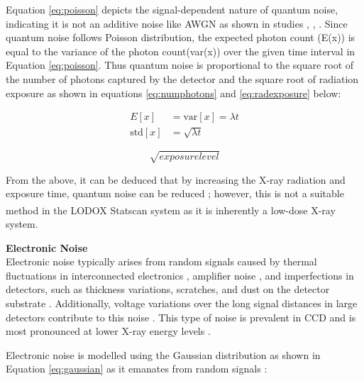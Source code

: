 Equation \ref{eq:poisson}  depicts the signal-dependent nature of quantum noise, indicating it is not an additive noise like \gls{AWGN} as shown in studies  \cite{khan_new_2016}, \cite{thanh_review_2019}, \cite{chandra_analysis_2020}. Since quantum noise follows Poisson distribution, the expected photon count (E(x)) is equal to the variance of the photon count(var(x)) over the given time interval in Equation \ref{eq:poisson}. Thus quantum noise is proportional to the square root of the number of photons captured by the detector \cite{chandra_analysis_2020} and the square root of radiation exposure \cite{huda_radiographic_2015} as shown in equations \ref{eq:numphotons} and \ref{eq:radexposure} below:

\begin{equation}
\begin{aligned}
    E[x] &= \text{var}[x] = \lambda t \\
    \text{std}[x] &= \sqrt{\lambda t}
\end{aligned}
\label{eq:numphotons}
\end{equation}


\begin{equation}
    \sqrt{exposure level}
    \label{eq:radexposure}
\end{equation}

From the above, it can be deduced that by increasing the X-ray radiation and exposure time, quantum noise can be reduced \cite{chandra_analysis_2020}; however, this is not a suitable method in the LODOX\textsuperscript{\textregistered} Statscan\textsuperscript{\textregistered} system as it is inherently a low-dose X-ray system. 


\textbf{Electronic Noise} \\
Electronic noise typically arises from random signals caused by thermal fluctuations in interconnected electronics \cite{gravel_method_2004}, amplifier noise \cite{goyal_noise_2018}, and imperfections in detectors, such as thickness variations, scratches, and dust on the detector substrate \cite{seibert_tradeoffs_2004}. Additionally, voltage variations over the long signal distances in large detectors contribute to this noise \cite{kim_measurements_2024}. This type of noise is prevalent in \gls{CCD} \cite{gravel_method_2004} and is most pronounced at lower X-ray energy levels \cite{veldkamp_dose_2009}.

Electronic noise is modelled using the Gaussian distribution as shown in Equation \ref{eq:gaussian} as it emanates from random signals \cite{juneja_denoising_2024}:

